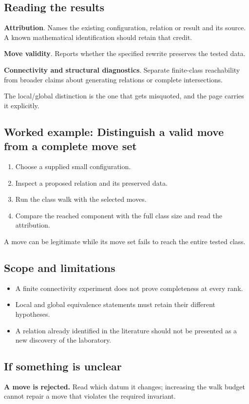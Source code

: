 \documentclass[11pt,a4paper]{article}
\begin{document}
\subsection*{Reading the results}
\textbf{Attribution}. Names the existing configuration, relation or result and its source. A known mathematical identification should retain that credit.

\textbf{Move validity}. Reports whether the specified rewrite preserves the tested data.

\textbf{Connectivity and structural diagnostics}. Separate finite-class reachability from broader claims about generating relations or complete intersections.

The local/global distinction is the one that gets misquoted, and the page carries it explicitly.
\subsection*{Worked example: Distinguish a valid move from a complete move set}
\begin{enumerate}
\item Choose a supplied small configuration.
\item Inspect a proposed relation and its preserved data.
\item Run the class walk with the selected moves.
\item Compare the reached component with the full class size and read the attribution.
\end{enumerate}
A move can be legitimate while its move set fails to reach the entire tested class.
\subsection*{Scope and limitations}
\begin{itemize}
\item A finite connectivity experiment does not prove completeness at every rank.
\item Local and global equivalence statements must retain their different hypotheses.
\item A relation already identified in the literature should not be presented as a new discovery of the laboratory.
\end{itemize}
\subsection*{If something is unclear}
\textbf{A move is rejected.} Read which datum it changes; increasing the walk budget cannot repair a move that violates the required invariant.
\end{document}
